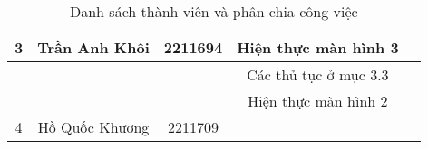 \begin{table}[H]
\begin{tabular}{|c|c|c|c|l|}
\multirow{-3}{*}{3} & \multirow{-3}{*}{Trần Anh Khôi}       & \multirow{-3}{*}{2211694}         & Hiện thực màn hình 3                  & \multirow{-3}{*}{}                                               \\ \hline
                    &                                       &                                   & Các thủ tục ở mục 3.3                      &                                                                       \\ \cline{4-4} 
                    &                                       &                                   & Hiện thực màn hình 2             &                                                                       \\ \cline{4-4} 
\multirow{-3}{*}{4} & \multirow{-3}{*}{Hồ Quốc Khương}      & \multirow{-3}{*}{2211709}         &                 & \multirow{-3}{*}{}                                               \\ \hline
\end{tabular}
\caption{Danh sách thành viên và phân chia công việc}
\label{tab:Members}
\end{table}

\newpage

